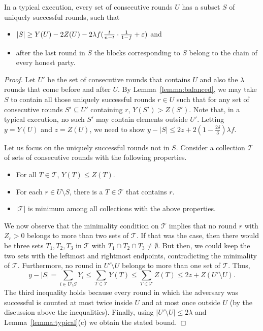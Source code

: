 \begin{lemma}[Unsuppressibility]\label{lem:unsuppressibility}
	In a typical execution,
	every set of consecutive rounds $U$ has a subset\/ $S$ of uniquely
	successful rounds, such that
	\begin{itemize}
		\item
			$|S|\ge Y(U)-2Z(U)-2\lambda f(\frac t{n-t}\cdot\frac1{1-f}+\varepsilon)$ and
		\item
			after the last round in $S$ the blocks corresponding to\/ $S$ belong to
			the chain of every honest party.
	\end{itemize}
\end{lemma}
\begin{proof}
	Let $U'$ be the set of consecutive rounds that contains $U$ and also the
	$\lambda$ rounds that come before and after $U$.
	By Lemma~\ref{lemma:balanced}, we may take $S$ to contain all those uniquely
	successful rounds $r\in U$ such that for any set of consecutive rounds
	$S' \subseteq U'$ containing $r$, $Y(S')>Z(S')$. Note that, in a typical execution,
	no such $S'$ may contain elements outside $U'$.
	Letting $y=Y(U)$ and $z=Z(U)$, we
	need to show $y-|S|\le2z+2(1-\frac{2\delta}{3})\lambda f$.

	Let us focus on the uniquely successful rounds not in $S$.
	Consider a collection $\mathcal{T}$ of sets of consecutive rounds with the
	following properties.
	\begin{itemize}
		\item
			For all $T\in\mathcal{T}$, $Y(T)\le Z(T)$.
		\item
			For each $r\in U\setminus S$, there is a $T\in\mathcal{T}$ that contains $r$.
		\item
			$|\mathcal{T}|$ is minimum among all collections with the above properties.
	\end{itemize}
	We now observe that the minimality condition on $\mathcal{T}$ implies that no round
	$r$ with $Z_r>0$ belongs to more than two sets of $\mathcal{T}$. If that was the
	case, then there would be three sets $T_1,T_2,T_3$ in $\mathcal{T}$ with
	$T_1\cap T_2\cap T_3\neq\emptyset$. But then, we could keep the two sets
	with the leftmost and rightmost endpoints, contradicting the minimality of
	$\mathcal{T}$. Furthermore, no round in $U'\setminus U$ belongs to more than one set
	of $\mathcal{T}$. Thus,
	\[
		y-|S|=\sum_{i\in U\setminus S}Y_i
			\le\sum_{T\in\mathcal{T}}Y(T)
			\le\sum_{T\in\mathcal{T}}Z(T)
			\le2z+Z(U'\setminus U)
	.\]
	The third inequality holds because every round in which the adversary
	was successful is counted at most twice inside $U$ and at most once outside
	$U$ (by the discussion above the inequalities). Finally,
	using $|U'\setminus U|\le2\lambda$ and Lemma~\ref{lemma:typical}(c) we
	obtain the stated bound.
\end{proof}

